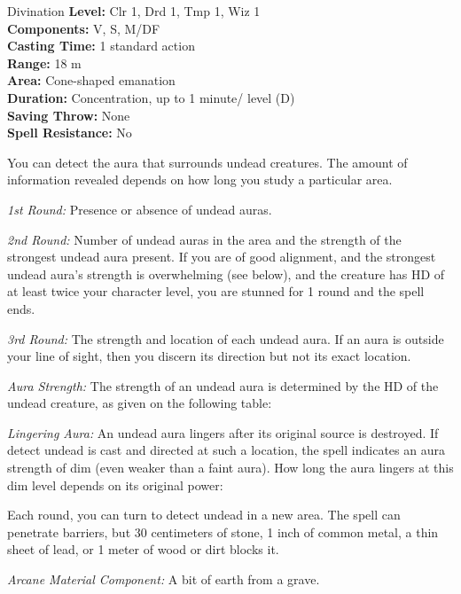 {Divination}
{
	\textbf{Level:}
	Clr 1, Drd 1, Tmp 1, Wiz 1\\
	\textbf{Components:}
	V, S, M/DF\\
	\textbf{Casting Time:}
	1 standard action\\
	\textbf{Range:}
	18 m\\
	\textbf{Area:}
	Cone-shaped emanation\\
	\textbf{Duration:}
	Concentration, up to 1 minute/ level (D)\\
	\textbf{Saving Throw:}
	None\\
	\textbf{Spell Resistance:}
	No\\
}
{
	You can detect the aura that surrounds undead creatures. The amount of information revealed depends on how long you study a particular area.

	\textit{1st Round:}
	Presence or absence of undead auras.

	\textit{2nd Round:}
	Number of undead auras in the area and the strength of the strongest undead aura present. If you are of good alignment, and the strongest undead aura's strength is overwhelming (see below), and the creature has HD of at least twice your character level, you are stunned for 1 round and the spell ends.

	\textit{3rd Round:}
	The strength and location of each undead aura. If an aura is outside your line of sight, then you discern its direction but not its exact location.

	\textit{Aura Strength:}
	The strength of an undead aura is determined by the HD of the undead creature, as given on the following table:


	\textit{Lingering Aura:}
	An undead aura lingers after its original source is destroyed. If detect undead is cast and directed at such a location, the spell indicates an aura strength of dim (even weaker than a faint aura). How long the aura lingers at this dim level depends on its original power:


	Each round, you can turn to detect undead in a new area. The spell can penetrate barriers, but 30 centimeters of stone, 1 inch of common metal, a thin sheet of lead, or 1 meter of wood or dirt blocks it.

	\textit{Arcane Material Component:}
	A bit of earth from a grave.

}
